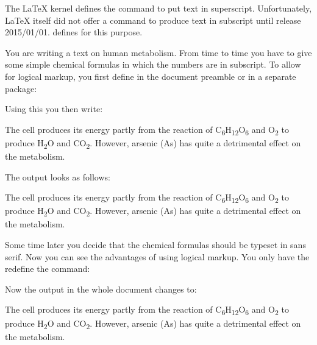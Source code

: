  \iffalse
  \begin{Declaration}
  \end{Declaration}
  The \LaTeX{} kernel defines the command
   to put text in
  superscript. Unfortunately,
  \LaTeX{} itself did not offer a command to
  produce text in subscript until
  release 2015/01/01. \KOMAScript{} defines  for this
  purpose. %
  \ifthiscommonfirst
    \begin{Example}
      You are writing a text on human metabolism. From time to time you
      have to give some simple chemical formulas in which the numbers are
      in subscript. To allow for logical markup, you first define in the
      document preamble or in a separate package:
\begin{lstcode}
  \newcommand*{\molec}[2]{#1\textsubscript{#2}}
\end{lstcode}
      \newcommand*{\molec}[2]{#1\textsubscript{#2}}
      Using this you then write:
\begin{lstcode}
  The cell produces its energy partly from the reaction of \molec C6\molec
  H{12}\molec O6 and \molec O2 to produce \molec H2\Molec O{} and
  \molec C{}\molec O2.  However, arsenic (\molec{As}{}) has quite a
  detrimental effect on the metabolism.
\end{lstcode}
      The output looks as follows:
      \begin{ShowOutput}
        The cell produces its energy partly from the reaction of \molec C6\molec
        H{12}\molec O6 and \molec O2 to produce \molec H2\molec O{} and
        \molec C{}\molec O2.  However, arsenic (\molec{As}{}) has quite a
        detrimental effect on the metabolism.
      \end{ShowOutput}

      Some time later you decide that the chemical formulas should be
      typeset in sans serif. Now you can see the advantages of using
      logical markup. You only have the redefine the 
      command:
\begin{lstcode}
  \newcommand*{\molec}[2]{\textsf{#1\textsubscript{#2}}}
\end{lstcode}
      \renewcommand*{\molec}[2]{\textsf{#1\textsubscript{#2}}}
      Now the output in the whole document changes to:
      \begin{ShowOutput}
        The cell produces its energy partly from the reaction of \molec
        C6\molec H{12}\molec O6 and \molec O2 to produce \molec H2\molec
        O{} and \molec C{}\molec O2.  However, arsenic (\molec{As}{}) has
        quite a detrimental effect on the metabolism.
      \end{ShowOutput}
    \end{Example}
